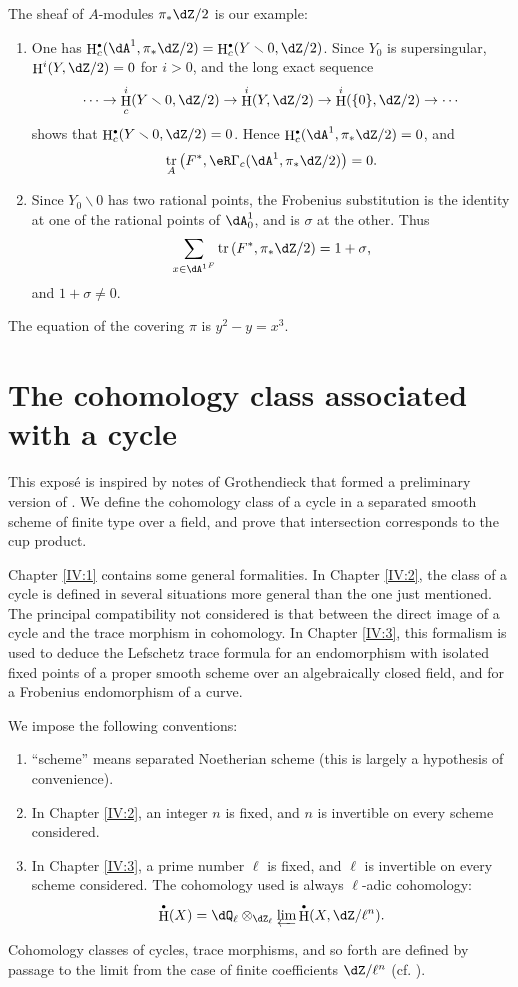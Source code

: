 \documentclass[12pt,oneside,english]{smfbook}
\DeclareMathOperator{\h}{H}
\DeclareMathOperator{\tr}{tr}
\renewcommand{\setminus}{\smallsetminus}
\let\oldbullet\bullet
\renewcommand{\bullet}{\textnormal{\tiny$\oldbullet$}}
\newcommand\blfootnote[1]{%
  \begingroup
  \renewcommand\thefootnote{}%
  \footnotetext{#1}%
  \endgroup
}
\begin{document}
The sheaf of $A$-modules $\pi_*\dZ/2$ is our example:
\begin{enumerate}[\indent a)]
  \item One has $\h_c^\bullet(\dA^1,\pi_*\dZ/2) = \h_c^\bullet(Y\setminus 0,\dZ/2)$. Since $Y_0$ is supersingular, $\h^i(Y,\dZ/2)=0$ for $i>0$, and the long exact sequence
    \[
      \cdots \to \h_c^i(Y\setminus 0,\dZ/2) \to \h^i(Y,\dZ/2) \to \h^i(\{0\},\dZ/2) \to \cdots
    \]
    shows that $\h_c^\bullet(Y\setminus0,\dZ/2)=0$. Hence $\h_c^\bullet(\dA^1,\pi_*\dZ/2)=0$, and
    \[
      \tr_A\left(F^*,\eR\Gamma_c(\dA^1,\pi_*\dZ/2)\right) = 0 \text{.}
    \]
  \item Since $Y_0\setminus0$ has two rational points, the Frobenius substitution is the identity at one of the rational points of $\dA_0^1$, and is $\sigma$ at the other. Thus
    \[
      \sum_{x\in {\dA^1}^F} \tr\left(F^*,\pi_*\dZ/2\right) = 1+\sigma \text{,}
    \]
    and $1+\sigma\ne0$.
\end{enumerate}

The equation of the covering $\pi$ is $y^2-y=x^3$.
\clearpage
\clearpage
\chapter{The cohomology class associated with a cycle}\label{IV}
\blfootnote{by A.\ Grothendieck, written up by P.\ Deligne}

This exposé is inspired by notes of Grothendieck that formed a preliminary version of \cite[IV]{sga5}. We define the cohomology class of a cycle in a separated smooth scheme of finite type over a field, and prove that intersection corresponds to the cup product.

Chapter \ref{IV:1} contains some general formalities. In Chapter \ref{IV:2}, the class of a cycle is defined in several situations more general than the one just mentioned. The principal compatibility not considered is that between the direct image of a cycle and the trace morphism in cohomology. In Chapter \ref{IV:3}, this formalism is used to deduce the Lefschetz trace formula for an endomorphism with isolated fixed points of a proper smooth scheme over an algebraically closed field, and for a Frobenius endomorphism of a curve.

We impose the following conventions:
\begin{enumerate}[\indent 1)]
  \item ``scheme'' means separated Noetherian scheme (this is largely a hypothesis of convenience).
  \item In Chapter \ref{IV:2}, an integer $n$ is fixed, and $n$ is invertible on every scheme considered.
  \item In Chapter \ref{IV:3}, a prime number $\ell$ is fixed, and $\ell$ is invertible on every scheme considered. The cohomology used is always $\ell$-adic cohomology:
    \[
      \h^\bullet(X) = \dQ_\ell\otimes_{\dZ_\ell} \varprojlim \h^\bullet(X,\dZ/\ell^n) \text{.}
    \]
\end{enumerate}
Cohomology classes of cycles, trace morphisms, and so forth are defined by passage to the limit from the case of finite coefficients $\dZ/\ell^n$ (cf. \cite[VI]{sga5}).
\end{document}
